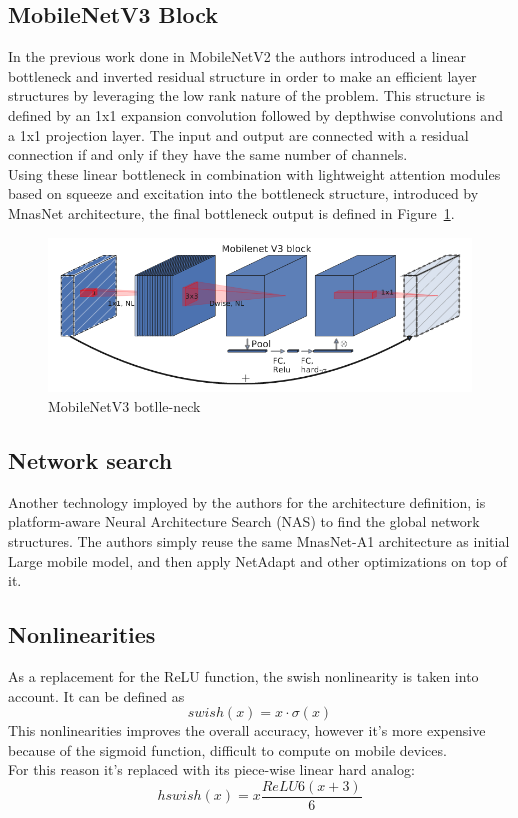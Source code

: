\documentclass[12pt, letterpaper, twoside]{article}
\begin{document}
\subsection{MobileNetV3 Block}
In the previous work done in MobileNetV2 the authors introduced a linear bottleneck and inverted residual structure in order to make an efficient layer structures by leveraging the low rank nature of the problem. This structure is defined by an 1x1 expansion convolution followed by depthwise convolutions and a 1x1 projection layer. The input and output are connected with a residual connection if and only if they have the same number of channels.\\
Using these linear bottleneck in combination with lightweight attention modules based on squeeze and excitation into the bottleneck structure, introduced by MnasNet architecture, the final bottleneck output is defined in Figure~\ref{fig:bottle_neck}.

\begin{figure}[H]
	\centering
	\includegraphics[width=1\textwidth]{bottle_neck.png}
	\caption{MobileNetV3 botlle-neck}
	\label{fig:bottle_neck}
\end{figure}

\subsection{Network search}
Another technology imployed by the authors for the architecture definition, is platform-aware Neural Architecture Search (NAS) to find the global network structures.
The authors simply reuse the same MnasNet-A1 architecture as initial Large mobile model, and then apply NetAdapt and other optimizations on top of it.

\subsection{Nonlinearities}
As a replacement for the ReLU function, the swish nonlinearity is taken into account. It can be defined as 
$$swish(x) = x \cdot \sigma(x)$$
This nonlinearities improves the overall accuracy, however it's more expensive because of the sigmoid function, difficult to compute on mobile devices. \\
For this reason it's replaced with its piece-wise linear hard analog:
$$hswish(x) = x \frac{ReLU6(x+3)}{6}$$
\end{document}

